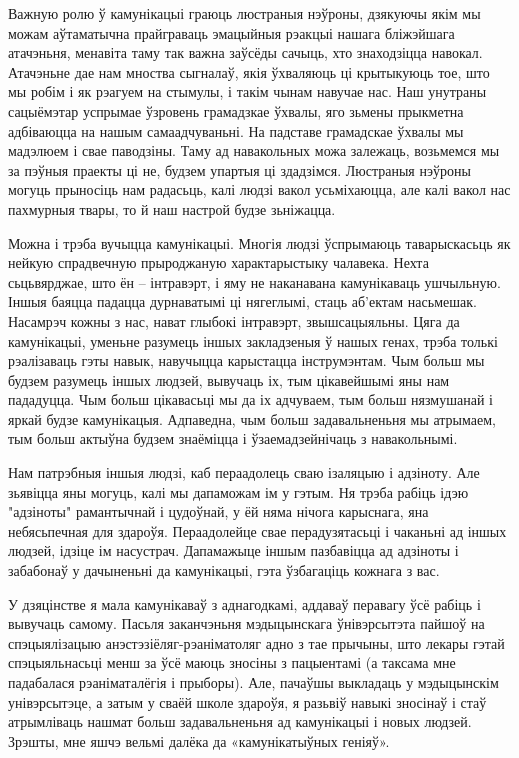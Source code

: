 Важную ролю ў камунікацыі граюць люстраныя нэўроны, дзякуючы якім мы можам аўтаматычна прайграваць эмацыйныя рэакцыі нашага бліжэйшага атачэньня, менавіта таму так важна заўсёды сачыць, хто знаходзіцца навокал. Атачэньне дае нам мноства сыгналаў, якія ўхваляюць ці крытыкуюць тое, што мы робім і як рэагуем на стымулы, і такім чынам навучае нас. Наш унутраны сацыёмэтар успрымае ўзровень грамадзкае ўхвалы, яго зьмены прыкметна адбіваюцца на нашым самаадчуваньні. На падставе грамадскае ўхвалы мы мадэлюем і свае паводзіны. Таму ад навакольных можа залежаць, возьмемся мы за пэўныя праекты ці не, будзем упартыя ці здадзімся. Люстраныя нэўроны могуць прыносіць нам радасьць, калі людзі вакол усьміхаюцца, але калі вакол нас пахмурныя твары, то й наш настрой будзе зьніжацца.

Можна і трэба вучыцца камунікацыі. Многія людзі ўспрымаюць таварыскасьць як нейкую спрадвечную прыроджаную характарыстыку чалавека. Нехта сьцьвярджае, што ён – інтравэрт, і яму не наканавана камунікаваць ушчыльную. Іншыя баяцца падацца дурнаватымі ці нягеглымі, стаць аб'ектам насьмешак. Насамрэч кожны з нас, нават глыбокі інтравэрт, звышсацыяльны. Цяга да камунікацыі, уменьне разумець іншых закладзеныя ў нашых генах, трэба толькі рэалізаваць гэты навык, навучыцца карыстацца інструмэнтам. Чым больш мы будзем разумець іншых людзей, вывучаць іх, тым цікавейшымі яны нам пададуцца. Чым больш цікавасьці мы да іх адчуваем, тым больш нязмушанай і яркай будзе камунікацыя. Адпаведна, чым больш задавальненьня мы атрымаем, тым больш актыўна будзем знаёміцца і ўзаемадзейнічаць з навакольнымі.

Нам патрэбныя іншыя людзі, каб пераадолець сваю ізаляцыю і адзіноту. Але зьявіцца яны могуць, калі мы дапаможам ім у гэтым. Ня трэба рабіць ідэю "адзіноты" рамантычнай і цудоўнай, у ёй няма нічога карыснага, яна небясьпечная для здароўя. Пераадолейце свае перадузятасьці і чаканьні ад іншых людзей, ідзіце ім насустрач. Дапамажыце іншым пазбавіцца ад адзіноты і забабонаў у дачыненьні да камунікацыі, гэта ўзбагаціць кожнага з вас.

У дзяцінстве я мала камунікаваў з аднагодкамі, аддаваў перавагу ўсё рабіць і вывучаць самому. Пасьля заканчэньня мэдыцынскага ўнівэрсытэта пайшоў на спэцыялізацыю анэстэзіёляг-рэаніматоляг адно з тае прычыны, што лекары гэтай спэцыяльнасьці менш за ўсё маюць зносіны з пацыентамі (а таксама мне падабалася рэаніматалёгія і прыборы). Але, пачаўшы выкладаць у мэдыцынскім унівэрсытэце, а затым у сваёй школе здароўя, я разьвіў навыкі зносінаў і стаў атрымліваць нашмат больш задавальненьня ад камунікацыі і новых людзей. Зрэшты, мне яшчэ вельмі далёка да «камунікатыўных геніяў».

